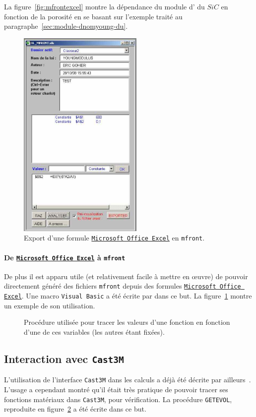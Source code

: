 \documentclass[12pt]{article}
\newcommand{\mfront}{\texttt{mfront}}
\newcommand{\castem}{\texttt{Cast3M}}
\newcommand{\sic}{$SiC$}
\newcommand{\excel}{\href{http://www.microsoft.com/france/office/2007/programs/excel/overview.mspx}{\texttt{Microsoft Office Excel}}}
\newcommand{\code}[1]{
  \psframebox[linecolor=ceaorange,shadow=true,blur=true]{
    \begin{minipage}[htbp]{1.0\linewidth}
      \ttfamily\scriptsize #1
    \end{minipage}
  }
}
\begin{document}
La figure~\ref{fig:mfrontexcel} montre la dépendance du module
d' du \sic{} en fonction de la porosité en se basant
sur l'exemple traité au paragraphe~\ref{sec:module-dnomyoung-du}.

\begin{figure}[htbp]
  \centering
  \includegraphics[width=6cm]{Images/mfront.eps}
  \caption{Export d'une formule \excel{} en \mfront{}.}
  \label{fig:exceltomfront}
\end{figure}

\paragraph{De \excel{} à \mfront{}}
De plus il est apparu utile (et relativement facile à mettre en
\oe{}uvre) de pouvoir directement généré des fichiers \mfront{} depuis
des formules \excel{}. Une macro \texttt{Visual Basic} a été écrite
par  dans ce but. La figure~\ref{fig:exceltomfront}
montre un exemple de son utilisation.

\begin{figure}[htbp]
  \centering
  \code{
    
  }
  \caption[Code de la procédure \texttt{GETEVOL}]{Procédure utilisée
    pour tracer les valeurs d'une fonction en fonction d'une de ces
    variables (les autres étant fixées).}
  \label{fig:getEvol}
\end{figure}

\subsection{Interaction avec \castem{}} L'utilisation de
l'interface \castem{} dans les calculs a déjà été décrite par
ailleurs~\cite{helfer07:_utilis}. L'usage a cependant montré qu'il
était très pratique de pouvoir tracer ses fonctions matériaux dans
\castem{}, pour vérification. La procédure \texttt{GETEVOL},
reproduite en figure~\ref{fig:getEvol} a été écrite dans ce but.
\end{document}
